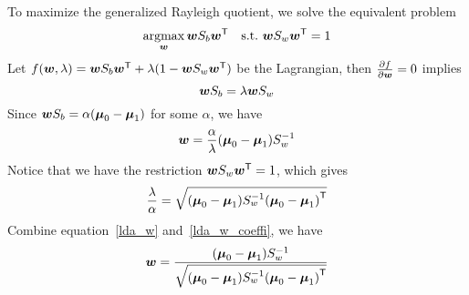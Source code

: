 To maximize the generalized Rayleigh quotient, we solve the equivalent problem
$$ \operatorname*{argmax}_{\boldsymbol{w}} \boldsymbol{w} S_b {\boldsymbol{w}}^\mathsf{T}\quad\text{s.t.\ } \boldsymbol{w}S_w {\boldsymbol{w}}^\mathsf{T} = 1$$
Let $f(\boldsymbol{w}, \lambda) = \boldsymbol{w} S_b {\boldsymbol{w}}^\mathsf{T} + \lambda(1 - \boldsymbol{w}S_w {\boldsymbol{w}}^\mathsf{T})$ be the Lagrangian, then 
$\frac{\partial {f}}{\partial {\ensuremath{\boldsymbol{w}}}} = 0$ implies
\begin{equation}
    \boldsymbol{w} S_b = \lambda \boldsymbol{w} S_w
\end{equation}
Since $\boldsymbol{w} S_b = \alpha (\boldsymbol{\mu}_0 - \boldsymbol{\mu}_1)$ for some $\alpha$, we have
\begin{equation}\label{lda_w}
    \boldsymbol{w} = \frac{\alpha}{\lambda} (\boldsymbol{\mu}_0 - \boldsymbol{\mu}_1)S_w^{-1}
\end{equation}
Notice that we have the restriction $\boldsymbol{w}S_w{\boldsymbol{w}}^\mathsf{T} = 1$, which gives
\begin{equation}\label{lda_w_coeffi}
    \frac{\lambda}{\alpha} = \sqrt{(\boldsymbol{\mu}_0 - \boldsymbol{\mu}_1)S_w^{-1}{(\boldsymbol{\mu}_0 - \boldsymbol{\mu}_1)}^\mathsf{T}}
\end{equation}
Combine equation~\eqref{lda_w} and~\eqref{lda_w_coeffi}, we have
\begin{equation}
    \boldsymbol{w} = 
    \frac{(\boldsymbol{\mu}_0 - \boldsymbol{\mu}_1)S_w^{-1}}{\sqrt{(\boldsymbol{\mu}_0 - \boldsymbol{\mu}_1)S_w^{-1}{(\boldsymbol{\mu}_0 - \boldsymbol{\mu}_1)}^\mathsf{T}}}
\end{equation}
